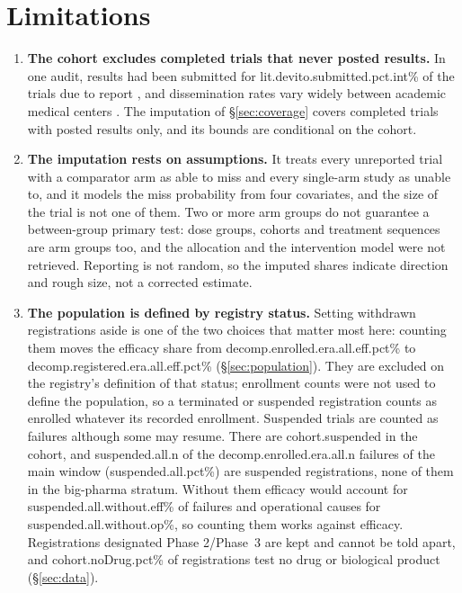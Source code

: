 \documentclass[11pt]{article}
\begin{document}
\section{Limitations}\label{sec:limitations}
\begin{enumerate}[leftmargin=*]
\item\label{lim:coverage} \textbf{The cohort excludes completed trials that never posted results.} In one audit, results had been submitted for \num{lit.devito.submitted.pct.int}\% of the trials due to report \cite{devito2020}, and dissemination rates vary widely between academic medical centers \cite{chen2016}. The imputation of \S\ref{sec:coverage} covers completed trials with posted results only, and its bounds are conditional on the cohort.
\item\label{lim:imputation} \textbf{The imputation rests on assumptions.} It treats every unreported trial with a comparator arm as able to miss and every single-arm study as unable to, and it models the miss probability from four covariates, and the size of the trial is not one of them. Two or more arm groups do not guarantee a between-group primary test: dose groups, cohorts and treatment sequences are arm groups too, and the allocation and the intervention model were not retrieved. Reporting is not random, so the imputed shares indicate direction and rough size, not a corrected estimate.
\item\label{lim:population} \textbf{The population is defined by registry status.} Setting withdrawn registrations aside is one of the two choices that matter most here: counting them moves the efficacy share from \num{decomp.enrolled.era.all.eff.pct}\% to \num{decomp.registered.era.all.eff.pct}\% (\S\ref{sec:population}). They are excluded on the registry's definition of that status; enrollment counts were not used to define the population, so a terminated or suspended registration counts as enrolled whatever its recorded enrollment. Suspended trials are counted as failures although some may resume. There are \num{cohort.suspended} in the cohort, and \num{suspended.all.n} of the \num{decomp.enrolled.era.all.n} failures of the main window (\num{suspended.all.pct}\%) are suspended registrations, none of them in the big-pharma stratum. Without them efficacy would account for \num{suspended.all.without.eff}\% of failures and operational causes for \num{suspended.all.without.op}\%, so counting them works against efficacy. Registrations designated Phase 2/Phase~3 are kept and cannot be told apart, and \num{cohort.noDrug.pct}\% of registrations test no drug or biological product (\S\ref{sec:data}).

\end{enumerate}
\end{document}
